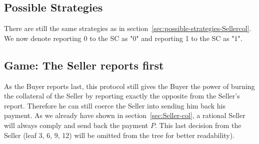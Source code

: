 \documentclass{cacthesis}
\begin{document}
\subsection{Possible Strategies}
\label{sec:possible-strategies-Sellercol-bothreport}
There are still the same strategies as in section~\ref{sec:possible-strategies-Sellercol}. We now denote reporting 0 to the SC as "$0$" and reporting 1 to the SC as "$1$".
\subsection{Game: The Seller reports first}
As the Buyer reports last, this protocol still gives the Buyer the power of
burning the collateral of the Seller by reporting exactly the opposite from the
Seller's report.
Therefore he can still coerce the Seller into sending him back his payment. As we already have shown in section~\ref{sec:Seller-col}, a rational
Seller will always comply and send back the payment $P$. This last decision from the Seller (leaf 3, 6, 9, 12) will be
omitted from the tree for better readability).\newline
\end{document}
